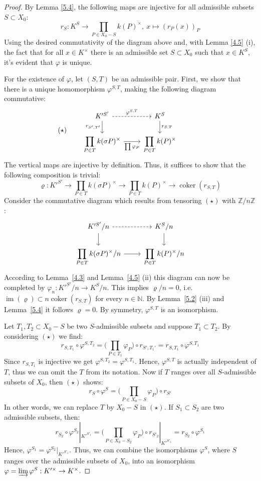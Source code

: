 \begin{proof}
By Lemma \ref{5.4}, the following maps are injective for all admissible subsets $S\subset X_0$:
\[ r_S:K^S \to\prod_{P\in X_0 -  S} k(P)^\times,\ x\mapsto (r_P(x))_P \]
Using the desired commutativity of the diagram above and, with Lemma \ref{4.5} (i), the fact that for all $x\in K^\times$ there is an admissible set $S\subset X_0$ such that $x\in K^S$, it's evident that $\varphi$ is unique. 

For the existence of $\varphi$, let $(S,T)$ be an admissible pair. First, we show that there is a unique homomorphism $\varphi^{S,T}$, making the following diagram commutative:
\[ (\star) \qquad \begin{tikzcd}
K'^{S'} \rar["\varphi^{S,T}", dashed] \dar["r_{S',T'}"'] & K^S \dar["r_{S,T}"]\\
\displaystyle \prod_{P\in T}k(\sigma P)^\times \rar["\prod\varphi_P"'] & \displaystyle \prod_{P\in T}k(P)^\times
\end{tikzcd} \phantom{\qquad (\star)} \]
The vertical maps are injective by definition. Thus, it suffices to show that the following composition is trivial:
\[\varrho:K'^{S'}\longrightarrow\prod_{P\in T} k(\sigma P)^\times \longrightarrow \prod_{P\in T} k(P)^\times\longrightarrow\operatorname{coker}(r_{S,T})\] 
Consider the commutative diagram which results from tensoring $(\star)$ with $\mathbb{Z}/n\mathbb{Z}$:
\[ \begin{tikzcd}
K'^{S'}/n \rar[dashed]\dar & K^S/n\dar\\
\displaystyle \prod_{P\in T}k(\sigma P)^\times/n \rar & \displaystyle \prod_{P\in T}k(P)^\times/n
\end{tikzcd} \]
According to Lemma~\ref{4.3} and Lemma~\ref{4.5} (ii) this diagram can now be completed by $\varphi_n: K'^{S'}/n\to K^S/n$. This implies $\varrho/n=0$, i.e. $\operatorname{im}(\varrho)\subset n\operatorname{coker}(r_{S,T})$ for every $n\in\mathbb{N}$. By Lemma~\ref{5.2} (iii) and Lemma~\ref{5.4} it follows $\varrho = 0$. By symmetry, $\varphi^{S,T}$ is an isomorphism.

Let $T_1, T_2\subset X_0 -  S$ be two $S$-admissible subsets and suppose $T_1\subset T_2$. By considering $(\star)$ we find:
\[ r_{S,T_1}\circ\varphi^{S,T_2}=\Big(\prod_{P\in T_1}\varphi_P\Big)\circ r_{S',T_1'} = r_{S,T_1}\circ\varphi^{S,T_1} \]
Since $r_{S,T_1}$ is injective we get $\varphi^{S,T_2}=\varphi^{S,T_1}$. Hence, $\varphi^{S,T}$ is actually independent of $T$, thus we can omit the $T$ from its notation. Now if $T$ ranges over all $S$-admissible subsets of $X_0$, then $(\star)$ shows:
\[ r_S\circ\varphi^S = \Big(\prod_{P\in X_0 -  S}\varphi_P \Big)\circ r_{S'} \]
In other words, we can replace $T$ by $X_0 -  S$ in $(\star)$. If $S_1\subset S_2$ are two admissible subsets, then:
\[ r_{S_2}\circ\varphi^{S_2}|_{K'^{S'_1}} = \Big(\prod_{P\in X_0 -  S_2}\varphi_P \Big)\circ r_{S'_2}|_{K'^{S'_1}} = r_{S_2}\circ\varphi^{S_1} \]
Hence, $\varphi^{S_1}=\varphi^{S_2}|_{K'^{S'_1}}$. Thus, we can combine the isomorphisms $\varphi^S$, where $S$ ranges over the admissible subsets of $X_0$, into an isomorphism $\varphi = \varinjlim \varphi^S: K'^\times \to K^\times$. 


\end{proof}
